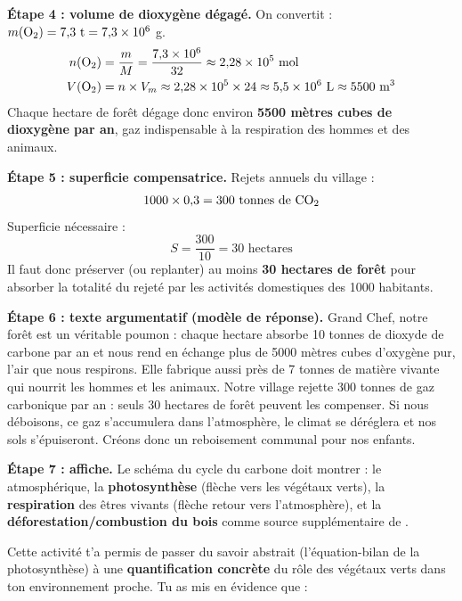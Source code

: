\documentclass[11pt]{article}
\newcounter{popsec}
\newcounter{popsub}
\newcommand{\courssub}[1]{%
  \stepcounter{popsub}%
  \par\vspace{9pt}\noindent{\popxbold\fontsize{11.5}{13}\selectfont\color{popink}{\color{poporange}\thepopsec.\thepopsub}\hspace{6pt}#1}\par\nopagebreak\vspace{4pt}
}
\begin{document}
\begin{exoresolu}
\textbf{Étape 4 : volume de dioxygène dégagé.} On convertit : $m(\ce{O2}) = 7{,}3 \text{ t} = 7{,}3 \times 10^{6}$ g.
\begin{align*}
n(\ce{O2}) &= \dfrac{m}{M} = \dfrac{7{,}3 \times 10^{6}}{32} \approx 2{,}28 \times 10^{5} \text{ mol} \\
V(\ce{O2}) &= n \times V_m \approx 2{,}28 \times 10^{5} \times 24 \approx 5{,}5 \times 10^{6} \text{ L} \approx \num{5500} \text{ m}^3
\end{align*}
Chaque hectare de forêt dégage donc environ \textbf{\num{5500} mètres cubes de dioxygène par an}, gaz indispensable à la respiration des hommes et des animaux.

\textbf{Étape 5 : superficie compensatrice.} Rejets annuels du village :
\[ \num{1000} \times 0{,}3 = 300 \text{ tonnes de } \ce{CO2} \]
Superficie nécessaire :
\[ S = \dfrac{300}{10} = 30 \text{ hectares} \]
Il faut donc préserver (ou replanter) au moins \textbf{30 hectares de forêt} pour absorber la totalité du  rejeté par les activités domestiques des \num{1000} habitants.

\textbf{Étape 6 : texte argumentatif (modèle de réponse).} \og Grand Chef, notre forêt est un véritable poumon : chaque hectare absorbe 10 tonnes de dioxyde de carbone par an et nous rend en échange plus de \num{5000} mètres cubes d'oxygène pur, l'air que nous respirons. Elle fabrique aussi près de 7 tonnes de matière vivante qui nourrit les hommes et les animaux. Notre village rejette 300 tonnes de gaz carbonique par an : seuls 30 hectares de forêt peuvent les compenser. Si nous déboisons, ce gaz s'accumulera dans l'atmosphère, le climat se déréglera et nos sols s'épuiseront. Créons donc un reboisement communal pour nos enfants. \fg

\textbf{Étape 7 : affiche.} Le schéma du cycle du carbone doit montrer : le  atmosphérique, la \textbf{photosynthèse} (flèche vers les végétaux verts), la \textbf{respiration} des êtres vivants (flèche retour vers l'atmosphère), et la \textbf{déforestation/combustion du bois} comme source supplémentaire de .
\end{exoresolu}

\courssub{Bilan de l'activité}

Cette activité t'a permis de passer du savoir abstrait (l'équation-bilan de la photosynthèse) à une \textbf{quantification concrète} du rôle des végétaux verts dans ton environnement proche. Tu as mis en évidence que :
\end{document}
